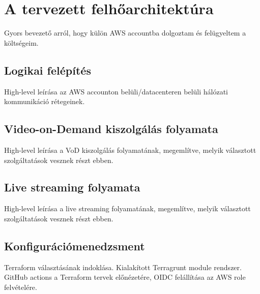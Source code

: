 \chapter{A tervezett felhőarchitektúra}

Gyors bevezető arról, hogy külön AWS accountba dolgoztam és felügyeltem a költségeim.

\section{Logikai felépítés}

High-level leírása az AWS accounton belüli/datacenteren belüli hálózati kommunikáció rétegeinek.

\section{Video-on-Demand kiszolgálás folyamata}

High-level leírása a VoD kiszolgálás folyamatának, megemlítve, melyik választott szolgáltatások vesznek részt ebben.

\section{Live streaming folyamata}

High-level leírása a live streaming folyamatának, megemlítve, melyik választott szolgáltatások vesznek részt ebben.

\section{Konfigurációmenedzsment}

Terraform választásának indoklása. Kialakított Terragrunt module rendszer. GitHub actions a Terraform tervek előnézetére, OIDC felállítása az AWS role felvételére.

